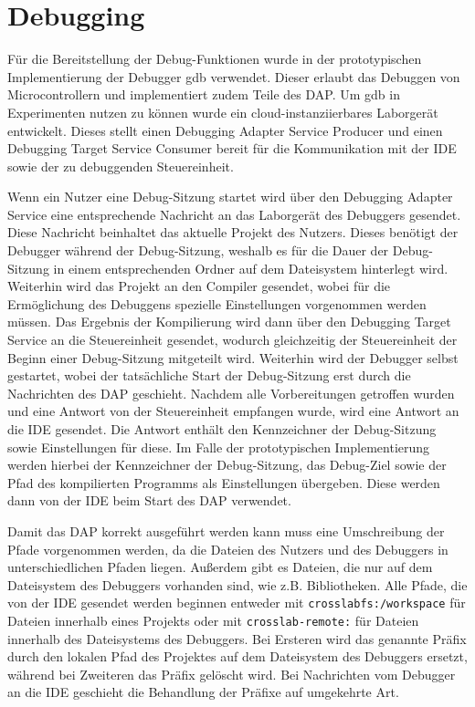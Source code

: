 \section{Debugging}\label{section:prototypische-implementierung:debugging}

Für die Bereitstellung der Debug-Funktionen wurde in der prototypischen Implementierung der Debugger gdb  verwendet. Dieser erlaubt das Debuggen von Microcontrollern und implementiert zudem Teile des \ac{DAP}. Um gdb in Experimenten nutzen zu können wurde ein cloud-instanziierbares Laborgerät entwickelt. Dieses stellt einen Debugging Adapter Service Producer und einen Debugging Target Service Consumer bereit für die Kommunikation mit der IDE sowie der zu debuggenden Steuereinheit.

Wenn ein Nutzer eine Debug-Sitzung startet wird über den Debugging Adapter Service eine entsprechende Nachricht an das Laborgerät des Debuggers gesendet. Diese Nachricht beinhaltet das aktuelle Projekt des Nutzers. Dieses benötigt der Debugger während der Debug-Sitzung, weshalb es für die Dauer der Debug-Sitzung in einem entsprechenden Ordner auf dem Dateisystem hinterlegt wird. Weiterhin wird das Projekt an den Compiler gesendet, wobei für die Ermöglichung des Debuggens spezielle Einstellungen vorgenommen werden müssen. Das Ergebnis der Kompilierung wird dann über den Debugging Target Service an die Steuereinheit gesendet, wodurch gleichzeitig der Steuereinheit der Beginn einer Debug-Sitzung mitgeteilt wird. Weiterhin wird der Debugger selbst gestartet, wobei der tatsächliche Start der Debug-Sitzung erst durch die Nachrichten des \ac{DAP} geschieht. Nachdem alle Vorbereitungen getroffen wurden und eine Antwort von der Steuereinheit empfangen wurde, wird eine Antwort an die IDE gesendet. Die Antwort enthält den Kennzeichner der Debug-Sitzung sowie Einstellungen für diese. Im Falle der prototypischen Implementierung werden hierbei der Kennzeichner der Debug-Sitzung, das Debug-Ziel sowie der Pfad des kompilierten Programms als Einstellungen übergeben. Diese werden dann von der IDE beim Start des \ac{DAP} verwendet.

Damit das \ac{DAP} korrekt ausgeführt werden kann muss eine Umschreibung der Pfade vorgenommen werden, da die Dateien des Nutzers und des Debuggers in unterschiedlichen Pfaden liegen. Außerdem gibt es Dateien, die nur auf dem Dateisystem des Debuggers vorhanden sind, wie z.B. Bibliotheken. Alle Pfade, die von der IDE gesendet werden beginnen entweder mit \texttt{crosslabfs:/workspace} für Dateien innerhalb eines Projekts oder mit \texttt{crosslab-remote:} für Dateien innerhalb des Dateisystems des Debuggers. Bei Ersteren wird das genannte Präfix durch den lokalen Pfad des Projektes auf dem Dateisystem des Debuggers ersetzt, während bei Zweiteren das Präfix gelöscht wird. Bei Nachrichten vom Debugger an die IDE geschieht die Behandlung der Präfixe auf umgekehrte Art.

